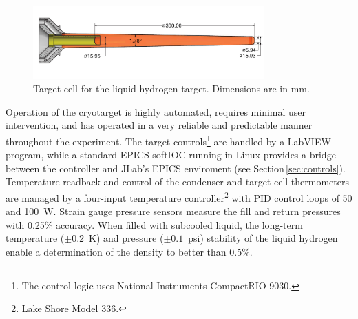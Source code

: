 \begin{figure}
\includegraphics[width=3.5in]{figures/GluexCell_mm.pdf}
\caption{Target cell for the liquid hydrogen target.  Dimensions are in mm.  }
\label{fig:TargetCell}
\end{figure}

Operation of the cryotarget is highly automated, requires minimal user intervention,
and has operated in a very reliable and predictable manner throughout the
experiment. 
The target controls\footnote{The control logic uses National Instruments CompactRIO 9030.} are handled by a LabVIEW program, 
while a standard EPICS softIOC running in Linux provides a
bridge between the controller and JLab's EPICS enviroment (see Section\,\ref{sec:controls}).     
Temperature readback and control of the condenser and target cell thermometers
are managed by a four-input temperature
controller\footnote{Lake Shore Model 336.} with PID control loops of 50 and 100~W.
Strain gauge pressure sensors measure the fill and return pressures with 0.25\% 
accuracy.  When filled with subcooled liquid, 
the long-term temperature ($\pm 0.2$~K) and pressure ($\pm 0.1$~psi)
stability of the liquid hydrogen enable a determination of the density to better than 0.5\%.


